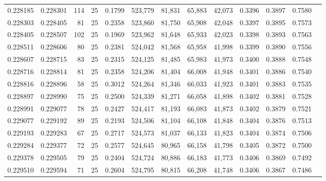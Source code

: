 \begin{tabular}{rrrrrrrrrrrrr}
0.228185 & 0.228301 &   114 &  25 &                                     0.1799 & 523,779 &  81,831 &  65,883 &  42,073 & 0.3396 & 0.3897 & 0.7580 \\
0.228303 & 0.228405 &    81 &  25 &                                     0.2358 & 523,860 &  81,750 &  65,908 &  42,048 & 0.3397 & 0.3895 & 0.7573 \\
0.228405 & 0.228507 &   102 &  25 &                                     0.1969 & 523,962 &  81,648 &  65,933 &  42,023 & 0.3398 & 0.3893 & 0.7563 \\
0.228511 & 0.228606 &    80 &  25 &                                     0.2381 & 524,042 &  81,568 &  65,958 &  41,998 & 0.3399 & 0.3890 & 0.7556 \\
0.228607 & 0.228715 &    83 &  25 &                                     0.2315 & 524,125 &  81,485 &  65,983 &  41,973 & 0.3400 & 0.3888 & 0.7548 \\
0.228716 & 0.228814 &    81 &  25 &                                     0.2358 & 524,206 &  81,404 &  66,008 &  41,948 & 0.3401 & 0.3886 & 0.7540 \\
0.228816 & 0.228896 &    58 &  25 &                                     0.3012 & 524,264 &  81,346 &  66,033 &  41,923 & 0.3401 & 0.3883 & 0.7535 \\
0.228897 & 0.228990 &    75 &  25 &                                     0.2500 & 524,339 &  81,271 &  66,058 &  41,898 & 0.3402 & 0.3881 & 0.7528 \\
0.228991 & 0.229077 &    78 &  25 &                                     0.2427 & 524,417 &  81,193 &  66,083 &  41,873 & 0.3402 & 0.3879 & 0.7521 \\
0.229077 & 0.229192 &    89 &  25 &                                     0.2193 & 524,506 &  81,104 &  66,108 &  41,848 & 0.3404 & 0.3876 & 0.7513 \\
0.229193 & 0.229283 &    67 &  25 &                                     0.2717 & 524,573 &  81,037 &  66,133 &  41,823 & 0.3404 & 0.3874 & 0.7506 \\
0.229284 & 0.229377 &    72 &  25 &                                     0.2577 & 524,645 &  80,965 &  66,158 &  41,798 & 0.3405 & 0.3872 & 0.7500 \\
0.229378 & 0.229505 &    79 &  25 &                                     0.2404 & 524,724 &  80,886 &  66,183 &  41,773 & 0.3406 & 0.3869 & 0.7492 \\
0.229510 & 0.229594 &    71 &  25 &                                     0.2604 & 524,795 &  80,815 &  66,208 &  41,748 & 0.3406 & 0.3867 & 0.7486 \\

\end{tabular}
